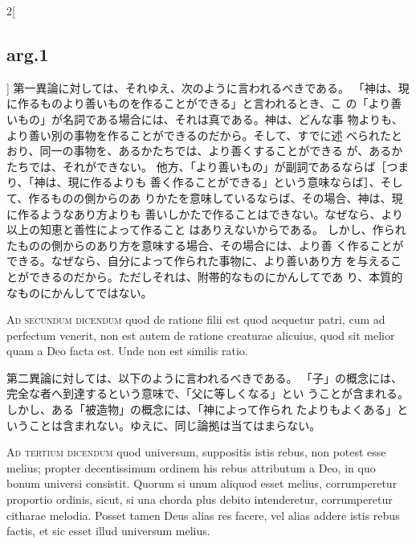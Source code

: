 \documentclass[paper=a4paper,fontsize=10pt,jafontsize=9pt,titlepage]{jlreq}
\begin{document}
\begin{paracol}{2}[\subsection{arg.1}]
第一異論に対しては、それゆえ、次のように言われるべきである。
「神は、現に作るものより善いものを作ることができる」と言われるとき、こ
 の「より善いもの」が名詞である場合には、それは真である。神は、どんな事
 物よりも、より善い別の事物を作ることができるのだから。そして、すでに述
 べられたとおり、同一の事物を、あるかたちでは、より善くすることができる
 が、あるかたちでは、それができない。
他方、「より善いもの」が副詞であるならば［つまり、「神は、現に作るよりも
 善く作ることができる」という意味ならば］、そして、作るものの側からのあ
 りかたを意味しているならば、その場合、神は、現に作るようなあり方よりも
 善いしかたで作ることはできない。なぜなら、より以上の知恵と善性によって作ること
 はありえないからである。
しかし、作られたものの側からのあり方を意味する場合、その場合には、より善
 く作ることができる。なぜなら、自分によって作られた事物に、より善いあり方
 を与えることができるのだから。ただしそれは、附帯的なものにかんしてであ
 り、本質的なものにかんしてではない。

\switchcolumn*[\subsection{ad.2}]

{\scshape Ad secundum dicendum} quod de ratione filii
est quod aequetur patri, cum ad perfectum venerit, non est autem de
ratione creaturae alicuius, quod sit melior quam a Deo facta est. Unde
non est similis ratio.

\switchcolumn

第二異論に対しては、以下のように言われるべきである。
「子」の概念には、完全な者へ到達するという意味で、「父に等しくなる」とい
 うことが含まれる。しかし、ある「被造物」の概念には、「神によって作られ
 たよりもよくある」ということは含まれない。ゆえに、同じ論拠は当てはまらない。

\switchcolumn*[\subsection{ad.3}]

{\scshape Ad tertium dicendum} quod universum,
suppositis istis rebus, non potest esse melius; propter decentissimum
ordinem his rebus attributum a Deo, in quo bonum universi
consistit. Quorum si unum aliquod esset melius, corrumperetur proportio
ordinis, sicut, si una chorda plus debito intenderetur, corrumperetur
citharae melodia. Posset tamen Deus alias res facere, vel alias addere
istis rebus factis, et sic esset illud universum melius.

\switchcolumn


\end{paracol}
\end{document}
